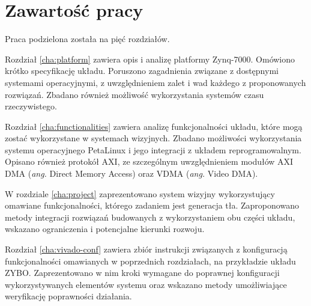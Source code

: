 \section{Zawartość pracy}

Praca podzielona została na pięć rozdziałów. %

Rozdział \ref{cha:platform} zawiera opis i analizę platformy Zynq-7000. Omówiono krótko specyfikację układu. Poruszono zagadnienia związane z dostępnymi systemami operacyjnymi, z uwzględnieniem zalet i wad każdego z proponowanych rozwiązań. Zbadano również możliwość wykorzystania systemów czasu rzeczywistego.

Rozdział \ref{cha:functionalities} zawiera analizę funkcjonalności układu, które mogą zostać wykorzystane w systemach wizyjnych. Zbadano możliwości wykorzystania systemu operacyjnego PetaLinux i jego integracji z układem reprogramowalnym. Opisano również protokół AXI, ze szczególnym uwzględnieniem modułów AXI DMA (\emph{ang.} Direct Memory Access) oraz VDMA (\emph{ang.} Video DMA).

W rozdziale \ref{cha:project} zaprezentowano system wizyjny wykorzystujący omawiane funkcjonalności, którego zadaniem jest generacja tła. Zaproponowano metody integracji rozwiązań budowanych z wykorzystaniem obu części układu, wskazano ograniczenia i potencjalne kierunki rozwoju. %

Rozdział \ref{cha:vivado-conf} zawiera zbiór instrukcji związanych z konfiguracją funkcjonalności omawianych w poprzednich rozdziałach, na przykładzie układu ZYBO. Zaprezentowano w nim kroki wymagane do poprawnej konfiguracji wykorzystywanych elementów systemu oraz wskazano metody umożliwiające weryfikację poprawności działania.